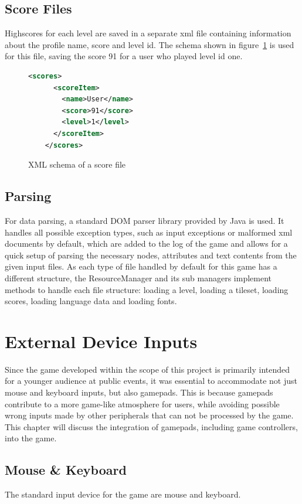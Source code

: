 \subsection{Score Files}\label{subsec:score-files}
Highscores for each level are saved in a separate xml file containing information about the profile name, score and level id.
The schema shown in figure~\ref{fig:xml-score} is used for this file, saving the score 91 for a user who played level id one.
\\
\begin{figure}
\begin{lstlisting}[language=XML,label={lst:score-xml}]
    <scores>
      <scoreItem>
        <name>User</name>
        <score>91</score>
        <level>1</level>
      </scoreItem>
    </scores>
\end{lstlisting}
    \caption{\gls{XML} schema of a score file}
    \label{fig:xml-score}
\end{figure}

\subsection{Parsing}\label{subsec:parsing}
For data parsing, a standard DOM parser library provided by Java is used.
It handles all possible exception types, such as input exceptions or malformed xml documents by default, which are added to the log of the game
and allows for a quick setup of parsing
the necessary nodes, attributes and text contents from the given input files.
As each type of file handled by default for this game has a different structure, the ResourceManager and its sub managers implement methods to handle
each file structure: loading a level, loading a tileset, loading scores, loading language data and loading fonts.

\section{External Device Inputs}\label{sec:external-device-inputs}
Since the game developed within the scope of this project is primarily intended for a younger audience at public events,
it was essential to accommodate not just mouse and keyboard inputs, but also gamepads.
This is because gamepads contribute to a more game-like atmosphere for users, while avoiding possible wrong inputs made by
other peripherals that can not be processed by the game.
This chapter will discuss the integration of gamepads, including game controllers, into the game.
\subsection{Mouse \& Keyboard}\label{subsec:mouse-&-keyboard}
The standard input device for the game are mouse and keyboard.
